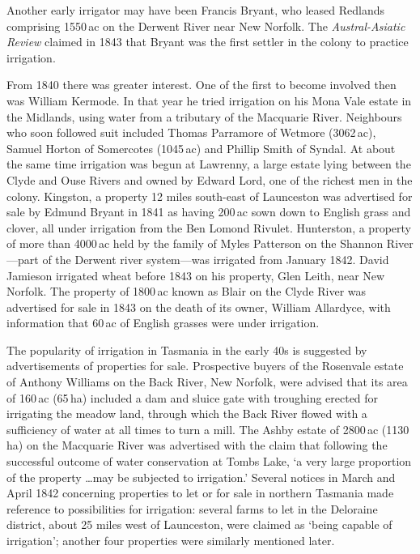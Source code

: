 Another early irrigator may have been Francis Bryant, who leased
Redlands comprising 1550\,ac on the Derwent River near New Norfolk.
The \textsl{Austral-Asiatic Review} claimed in 1843 that Bryant was
the first settler in the colony to practice
irrigation.

From 1840 there was greater interest.  One of the first to become
involved then was William Kermode.  In that year he tried irrigation
on his Mona Vale estate in the Midlands, using water from a tributary
of the Macquarie River.  Neighbours who soon followed suit included
Thomas Parramore of Wetmore (3062\,ac), Samuel Horton of Somercotes
(1045\,ac) and Phillip Smith of Syndal.  At about the same time
irrigation was begun at Lawrenny, a large estate lying between the
Clyde and Ouse Rivers and owned by Edward Lord, one of the richest men
in the colony.  Kingston, a property 12 miles south-east of Launceston
was advertised for sale by Edmund Bryant in 1841 as having 200\,ac
sown down to English grass and clover, all under irrigation from the
Ben Lomond Rivulet.  Hunterston, a property of more than 4000\,ac held
by the family of Myles Patterson on the Shannon River---part of the
Derwent river system---was irrigated from January 1842.  David
Jamieson irrigated wheat before 1843 on his property, Glen Leith, near
New Norfolk.  The property of 1800\,ac known as Blair on the Clyde
River was advertised for sale in 1843 on the death of its owner,
William Allardyce, with information that 60\,ac of English grasses
were under irrigation.

The popularity of irrigation in Tasmania in the early 40s is suggested
by advertisements of properties for sale.  Prospective buyers of the
Rosenvale estate of Anthony Williams on the Back River, New Norfolk,
were advised that its area of 160\,ac (65\,ha) included a dam and
sluice gate with troughing erected for irrigating the meadow land,
through which the Back River flowed with a sufficiency of water at all
times to turn a mill.  The Ashby estate of 2800\,ac (1130\,ha) on the
Macquarie River was advertised with the claim that following the
successful outcome of water conservation at Tombs Lake, `a very large
proportion of the property \ldots may be subjected to irrigation.'
Several notices in March and April 1842 concerning properties to let
or for sale in northern Tasmania made reference to possibilities for
irrigation: several farms to let in the Deloraine district, about 25
miles west of Launceston, were claimed as `being capable of
irrigation'; another four properties were similarly mentioned
later.

